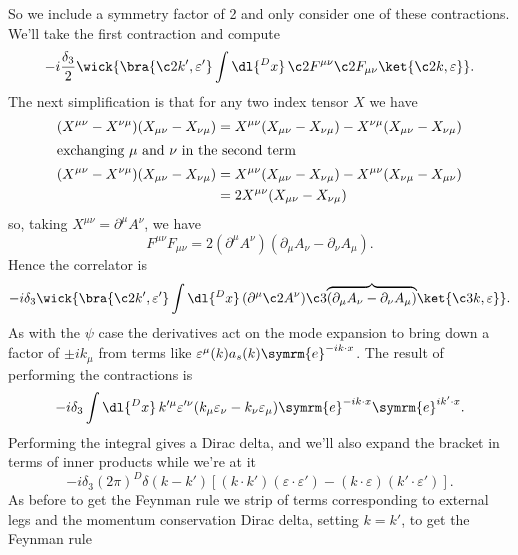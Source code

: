 \documentclass[fleqn]{NotesClass}
\newcommand{\e}{\symrm{e}}
\begin{document}
    So we include a symmetry factor of 2 and only consider one of these contractions.
    We'll take the first contraction and compute
    \begin{equation}
        -i \frac{\delta_3}{2} \wick{\bra{\c2{k}', \varepsilon'} \int \dl{^Dx} \, \c2{F}^{\mu\nu} \c2{F}_{\mu\nu} \ket{\c2{k}, \varepsilon}}.
    \end{equation}
    The next simplification is that for any two index tensor \(X\) we have
    \begin{align}
        (X^{\mu\nu} - X^{\nu\mu})(X_{\mu\nu} - X_{\nu\mu}) &= X^{\mu\nu}(X_{\mu\nu} - X_{\nu\mu}) - X^{\nu\mu}(X_{\mu\nu} - X_{\nu\mu})\\
        \shortintertext{exchanging \(\mu\) and \(\nu\) in the second term}
        (X^{\mu\nu} - X^{\nu\mu})(X_{\mu\nu} - X_{\nu\mu}) &= X^{\mu\nu}(X_{\mu\nu} - X_{\nu\mu}) - X^{\mu\nu}(X_{\nu\mu} - X_{\mu\nu})\\
        &= 2X^{\mu\nu}(X_{\mu\nu} - X_{\nu\mu})
    \end{align}
    so, taking \(X^{\mu\nu} = \partial^\mu A^\nu\), we have
    \begin{equation}
        F^{\mu\nu}F_{\mu\nu} = 2(\partial^\mu A^\nu)(\partial_\mu A_\nu - \partial_\nu A_\mu).
    \end{equation}
    Hence the correlator is
    \begin{equation}
        -i \delta_3 \wick{\bra{\c2{k}', \varepsilon'} \int \dl{^Dx} \, (\partial^\mu \c2{A}^\nu)\c3{\overbrace{(\partial_\mu A_\nu - \partial_\nu A_\mu)}} \ket{\c3{k}, \varepsilon}}.
    \end{equation}
    As with the \(\psi\) case the derivatives act on the mode expansion to bring down a factor of \(\pm ik_\mu\) from terms like \(\varepsilon^\mu(k)a_s(k)\e^{-ik\cdot x}\).
    The result of performing the contractions is
    \begin{equation}
        -i\delta_3 \int \dl{^Dx} \, k'^\mu \varepsilon'^\nu (k_\mu \varepsilon_\nu - k_\nu \varepsilon_\mu) \e^{-ik\cdot x} \e^{ik' \cdot x}.
    \end{equation}
    Performing the integral gives a Dirac delta, and we'll also expand the bracket in terms of inner products while we're at it
    \begin{equation}
        -i\delta_3(2\pi)^D\delta(k - k')[(k \cdot k')(\varepsilon \cdot \varepsilon') - (k \cdot \varepsilon)(k' \cdot \varepsilon')].
    \end{equation}
    As before to get the Feynman rule we strip of terms corresponding to external legs and the momentum conservation Dirac delta, setting \(k = k'\), to get the Feynman rule
\end{document}
